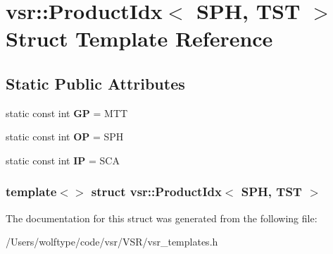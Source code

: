 \hypertarget{structvsr_1_1_product_idx_3_01_s_p_h_00_01_t_s_t_01_4}{\section{vsr\-:\-:Product\-Idx$<$ S\-P\-H, T\-S\-T $>$ Struct Template Reference}
\label{structvsr_1_1_product_idx_3_01_s_p_h_00_01_t_s_t_01_4}
}
\subsection*{Static Public Attributes}
\begin{DoxyCompactItemize}
\item 
\hypertarget{structvsr_1_1_product_idx_3_01_s_p_h_00_01_t_s_t_01_4_a99fbaf41691b540f1d2ad297466d67ed}{static const int {\bfseries G\-P} = M\-T\-T}\label{structvsr_1_1_product_idx_3_01_s_p_h_00_01_t_s_t_01_4_a99fbaf41691b540f1d2ad297466d67ed}

\item 
\hypertarget{structvsr_1_1_product_idx_3_01_s_p_h_00_01_t_s_t_01_4_a68278441bed01b3b7f223c99f8f75e9d}{static const int {\bfseries O\-P} = S\-P\-H}\label{structvsr_1_1_product_idx_3_01_s_p_h_00_01_t_s_t_01_4_a68278441bed01b3b7f223c99f8f75e9d}

\item 
\hypertarget{structvsr_1_1_product_idx_3_01_s_p_h_00_01_t_s_t_01_4_a00a9f55efcb7f0c6ec3bb9fb8cf44df8}{static const int {\bfseries I\-P} = S\-C\-A}\label{structvsr_1_1_product_idx_3_01_s_p_h_00_01_t_s_t_01_4_a00a9f55efcb7f0c6ec3bb9fb8cf44df8}

\end{DoxyCompactItemize}
\subsubsection*{template$<$$>$ struct vsr\-::\-Product\-Idx$<$ S\-P\-H, T\-S\-T $>$}



The documentation for this struct was generated from the following file\-:\begin{DoxyCompactItemize}
\item 
/\-Users/wolftype/code/vsr/\-V\-S\-R/vsr\-\_\-templates.\-h\end{DoxyCompactItemize}
